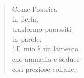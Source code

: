
\begin{verse}
    Come l'ostrica\\
    in perla,\\
    trasformo parassiti\\
    in parole.\\!
    Il mio è un lamento\\
    che ammalia e seduce\\
    con preziose collane.
\end{verse}